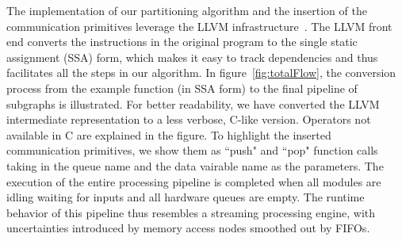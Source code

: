The implementation of our partitioning algorithm and the insertion of the communication primitives leverage the LLVM infrastructure~\cite{llvmflow}. The LLVM front end converts the instructions in the original program to the single static assignment (SSA) form, which makes it easy to track dependencies and thus facilitates all the steps in our algorithm.
In figure~\ref{fig:totalFlow}, the conversion process from the example function (in SSA form) to the final pipeline of subgraphs is illustrated. For better readability, we have converted the LLVM intermediate representation to a less verbose, C-like version. Operators not available in C are explained in the figure.
To highlight
the inserted communication primitives, we show them as ``push" and ``pop" function calls taking in the queue name and the data vairable name as the parameters. The execution of the entire processing pipeline is completed when all modules are idling waiting for inputs and all hardware queues are empty. The runtime behavior of this pipeline thus resembles a streaming processing engine, with uncertainties introduced by memory access nodes smoothed out by FIFOs.


